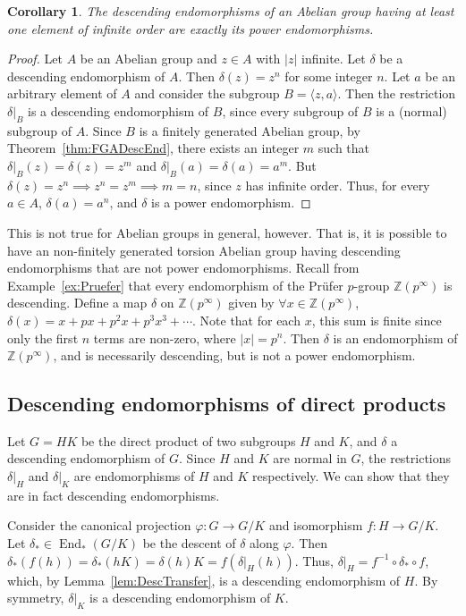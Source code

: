 \documentclass[11pt, a4paper]{article}
\DeclareMathOperator{\End}{End}
\newtheorem{Corollary}[Theorem]{Corollary}
\theoremstyle{definition}
\begin{document}
\begin{Corollary}\label{cor:NTADescEnd}
The descending endomorphisms of an Abelian group having at least one element of infinite order are exactly its power endomorphisms.
\end{Corollary}
\begin{proof}
Let $A$ be an Abelian group and $z \in A$ with $|z|$ infinite. Let $\delta$ be a descending endomorphism of $A$. Then $\delta(z) = z^n$ for some integer $n$. Let $a$ be an arbitrary element of $A$ and consider the subgroup $B = \langle z, a\rangle$. Then the restriction $\delta|_B$ is a descending endomorphism of $B$, since every subgroup of $B$ is a (normal) subgroup of $A$. Since $B$ is a finitely generated Abelian group, by Theorem~\ref{thm:FGADescEnd}, there exists an integer $m$ such that $\delta|_B(z) = \delta(z) = z^m$ and $\delta|_B(a) = \delta(a) = a^m$. But $\delta(z) = z^n \implies z^n = z^m \implies m = n$, since $z$ has infinite order. Thus, for every $a \in A$, $\delta(a) = a^n$, and $\delta$ is a power endomorphism.
\end{proof}

This is not true for Abelian groups in general, however. That is, it is possible to have an non-finitely generated torsion Abelian group having descending endomorphisms that are not power endomorphisms. Recall from Example~\ref{ex:Pruefer} that every endomorphism of the Pr\"ufer $p$-group $\mathbb Z(p^\infty)$ is descending. Define a map $\delta$ on $\mathbb Z(p^\infty)$ given by $\forall x \in \mathbb Z(p^\infty)$, $\delta(x) = x + p x + p^2 x + p^3 x^3 + \cdots$. Note that for each $x$, this sum is finite since only the first $n$ terms are non-zero, where $|x| = p^n$. Then $\delta$ is an endomorphism of $\mathbb Z(p^\infty)$, and is necessarily descending, but is not a power endomorphism.

\subsection{Descending endomorphisms of direct products}\label{subsec:End*(HxK)}
Let $G = HK$ be the direct product of two subgroups $H$ and $K$, and $\delta$ a descending endomorphism of $G$. Since $H$ and $K$ are normal in $G$, the restrictions $\delta|_H$ and $\delta|_K$ are endomorphisms of $H$ and $K$ respectively. We can show that they are in fact descending endomorphisms.

Consider the canonical projection $\varphi \colon G \to G/K$ and isomorphism $f \colon H \to G/K$. Let $\delta_* \in \End_*(G/K)$ be the descent of $\delta$ along $\varphi$. Then $\delta_*(f(h)) = \delta_*(hK) = \delta(h)K = f(\delta|_H(h))$. Thus, $\delta|_H = f^{-1} \circ \delta_* \circ f$, which, by Lemma~\ref{lem:DescTransfer}, is a descending endomorphism of $H$. By symmetry, $\delta|_K$ is a descending endomorphism of $K$.
\end{document}
